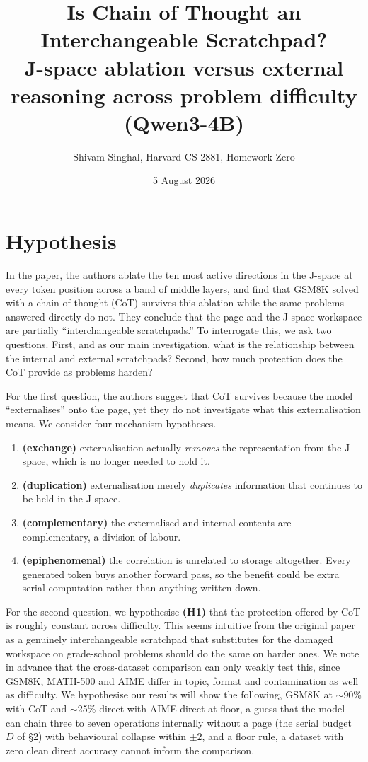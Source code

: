 \documentclass[10pt,a4paper]{article}
\title{\vspace{-1.2em}Is Chain of Thought an Interchangeable Scratchpad?\\
\large J-space ablation versus external reasoning across problem difficulty (Qwen3-4B)}
\author{Shivam Singhal, Harvard CS 2881, Homework Zero}
\date{5 August 2026}
\begin{document}
\maketitle
\vspace{-3.3em}
\small

\section{Hypothesis}
In the paper, the authors ablate the ten most active directions in the J-space at every
token position across a band of middle layers, and find that GSM8K solved with a chain of
thought (CoT) survives this ablation while the same problems answered directly do not.
They conclude that the page and the J-space workspace are partially ``interchangeable
scratchpads.'' To interrogate this, we ask two questions. First, and as our main
investigation, what is the relationship between the internal and external scratchpads?
Second, how much protection does the CoT provide as problems harden?

For the first question, the authors suggest that CoT survives because the model
``externalises'' onto the page, yet they do not investigate what this externalisation
means. We consider four mechanism hypotheses.
\begin{enumerate}\setlength\itemsep{0.1em}
\item \textbf{(exchange)} externalisation actually \emph{removes} the representation from
the J-space, which is no longer needed to hold it.
\item \textbf{(duplication)} externalisation merely \emph{duplicates} information that
continues to be held in the J-space.
\item \textbf{(complementary)} the externalised and internal contents are complementary,
a division of labour.
\item \textbf{(epiphenomenal)} the correlation is unrelated to storage altogether. Every
generated token buys another forward pass, so the benefit could be extra serial
computation rather than anything written down.
\end{enumerate}

For the second question, we hypothesise \textbf{(H1)} that the protection offered by CoT
is roughly constant across difficulty. This seems intuitive from the original paper as a
genuinely interchangeable scratchpad that substitutes for the damaged workspace on
grade-school problems should do the same on harder ones. We note in advance that the cross-dataset
comparison can only weakly test this, since GSM8K, MATH-500 and AIME differ in topic, format
and contamination as well as difficulty.  We hypothesise our results will show the
following, GSM8K at $\sim$90\% with CoT and $\sim$25\% direct with AIME direct at
floor, a guess that the model can chain three to seven operations internally without a
page (the serial budget $D$ of \S2) with behavioural collapse within $\pm2$, and a
floor rule, a dataset with zero
clean direct accuracy cannot inform the comparison.
\end{document}
